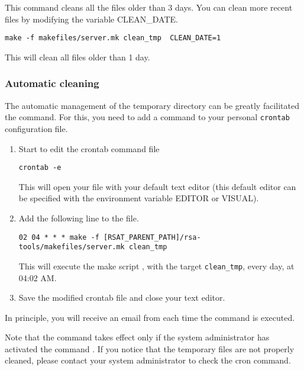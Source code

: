 \documentclass[12pt,a4paper, twoside]{scrreprt} %
\begin{document}
This command cleans all the files older than 3 days. You can clean
more recent files by modifying the variable CLEAN\_DATE.

\begin{lstlisting}
make -f makefiles/server.mk clean_tmp  CLEAN_DATE=1
\end{lstlisting}

This will clean all files older than 1 day.

\subsubsection{Automatic cleaning}

The automatic management of the temporary directory can be greatly
facilitated the  command. For this, you need to add a
command to your personal \texttt{crontab} configuration file.

\begin{enumerate}
\item Start to edit the crontab command file

\begin{lstlisting}
crontab -e
\end{lstlisting}

This will open your  file with your default text editor
(this default editor can be specified with the environment variable
EDITOR or VISUAL).

\item Add the following line to the  file. 

\begin{lstlisting}
02 04 * * * make -f [RSAT_PARENT_PATH]/rsa-tools/makefiles/server.mk clean_tmp
\end{lstlisting}

This will execute the make script , with the target
\texttt{clean\_tmp}, every day, at 04:02 AM. 

\item Save the modified crontab file and close your text editor.

\end{enumerate}

In principle, you will receive an email from  each
time the command is executed.

Note that the command  takes effect only if the
system administrator has activated the command . If you
notice that the temporary files are not properly cleaned, please
contact your system administrator to check the cron command.
\end{document}
